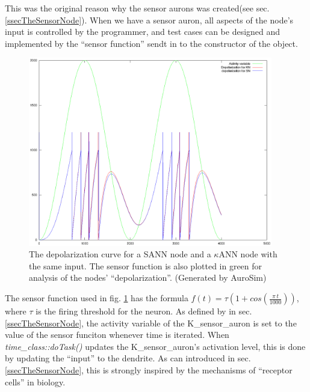 This was the original reason why the sensor aurons was created(see sec. \ref{ssecTheSensorNode}).
When we have a sensor auron, all aspects of the node's input is controlled by the programmer, and test cases can be designed and implemented by the ``sensor function'' sendt in to the constructor of the object.


\begin{figure}[hbtp!]
	\centering
		\includegraphics[width=0.95\textwidth]{eps_Comparison_between_the_two_sensors__depol}
	\caption{The depolarization curve for a SANN node and a $\kappa$ANN node with the same input. The sensor function is also plotted in green for analysis of the nodes' ``depolarization''. %
	(Generated by AuroSim)}
	\label{figComparisonBetweenSsensorAndKsensorDepolCurve}
\end{figure}

The sensor function used in fig. \ref{figComparisonBetweenSsensorAndKsensorDepolCurve} has the formula \mbox{$f(t) = \tau (1 + cos( \frac{\pi \, t}{1000} ))$}, where $\tau$ is the firing threshold for the neuron. 
As defined by in sec. \ref{ssecTheSensorNode}, the activity variable of the K\_sensor\_auron is set to the value of the sensor funciton whenever time is iterated. %
When \emph{time\_class::doTask()} updates the K\_sensor\_auron's activation level, this is done by updating the ``input'' to the dendrite.
As can introduced in sec. \ref{ssecTheSensorNode}, this is strongly inspired by the mechanisms of ``receptor cells'' in biology. %







